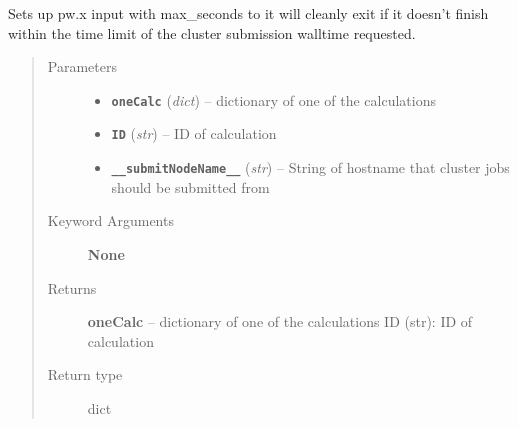 \documentclass[letterpaper,10pt,english]{sphinxmanual}
\begin{document}
\begin{fulllineitems}
\label{run:run.__setupRestartPW}
Sets up pw.x input with max\_seconds to it will cleanly exit if it
doesn't finish within the time limit of the cluster submission
walltime requested.
\begin{quote}\begin{description}
\item[{Parameters}] \leavevmode\begin{itemize}
\item {} 
\textbf{\texttt{oneCalc}} (\emph{dict}) -- dictionary of one of the calculations

\item {} 
\textbf{\texttt{ID}} (\emph{str}) -- ID of calculation

\item {} 
\textbf{\texttt{\_\_submitNodeName\_\_}} (\emph{str}) -- String of hostname that cluster jobs should be submitted from

\end{itemize}

\item[{Keyword Arguments}] \leavevmode
\textbf{None}

\item[{Returns}] \leavevmode
\textbf{oneCalc} --
dictionary of one of the calculations
ID (str): ID of calculation

\item[{Return type}] \leavevmode
dict

\end{description}\end{quote}

\end{fulllineitems}

\end{document}
